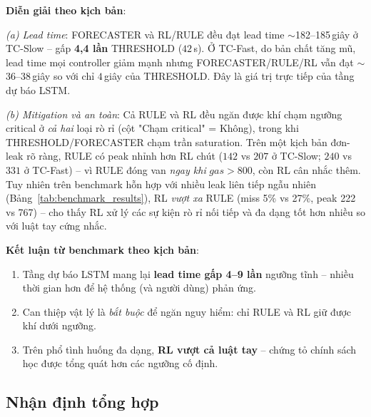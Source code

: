 \textbf{Diễn giải theo kịch bản}:

\textit{(a) Lead time}: FORECASTER và RL/RULE đều đạt lead time $\sim$182--185\,giây ở TC-Slow -- gấp \textbf{4{,}4 lần} THRESHOLD ($42$\,s). Ở TC-Fast, do bản chất tăng mũ, lead time mọi controller giảm mạnh nhưng FORECASTER/RULE/RL vẫn đạt $\sim$36--38\,giây so với chỉ $4$\,giây của THRESHOLD. Đây là giá trị trực tiếp của tầng dự báo LSTM.

\textit{(b) Mitigation và an toàn}: Cả RULE và RL đều ngăn được khí chạm ngưỡng critical ở \emph{cả hai} loại rò rỉ (cột "Chạm critical" = Không), trong khi THRESHOLD/FORECASTER chạm trần saturation. Trên một kịch bản đơn-leak rõ ràng, RULE có peak nhỉnh hơn RL chút ($142$ vs $207$ ở TC-Slow; $240$ vs $331$ ở TC-Fast) -- vì RULE đóng van \emph{ngay khi} $gas>800$, còn RL cân nhắc thêm. Tuy nhiên trên benchmark hỗn hợp với nhiều leak liên tiếp ngẫu nhiên (Bảng~\ref{tab:benchmark_results}), RL \emph{vượt xa} RULE (miss 5\% vs 27\%, peak 222 vs 767) -- cho thấy RL xử lý các sự kiện rò rỉ nối tiếp và đa dạng tốt hơn nhiều so với luật tay cứng nhắc.

\textbf{Kết luận từ benchmark theo kịch bản}:
\begin{enumerate}
  \item Tầng dự báo LSTM mang lại \textbf{lead time gấp 4--9 lần} ngưỡng tĩnh -- nhiều thời gian hơn để hệ thống (và người dùng) phản ứng.
  \item Can thiệp vật lý là \emph{bắt buộc} để ngăn nguy hiểm: chỉ RULE và RL giữ được khí dưới ngưỡng.
  \item Trên phổ tình huống đa dạng, \textbf{RL vượt cả luật tay} -- chứng tỏ chính sách học được tổng quát hơn các ngưỡng cố định.
\end{enumerate}

\subsection{Nhận định tổng hợp}

